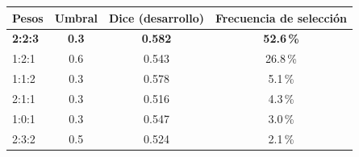 \small
\begin{tabular}{lccc}
\toprule
Pesos & Umbral & Dice (desarrollo) & Frecuencia de selección \\
\midrule
\textbf{2:2:3} & \textbf{0.3} & \textbf{0.582} & \textbf{52.6\,\%} \\
1:2:1 & 0.6 & 0.543 & 26.8\,\% \\
1:1:2 & 0.3 & 0.578 & 5.1\,\% \\
2:1:1 & 0.3 & 0.516 & 4.3\,\% \\
1:0:1 & 0.3 & 0.547 & 3.0\,\% \\
2:3:2 & 0.5 & 0.524 & 2.1\,\% \\
\bottomrule
\end{tabular}%

